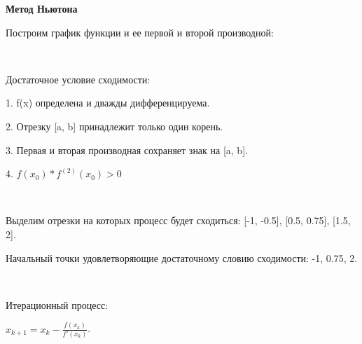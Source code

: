 \documentclass[]{article}
\begin{document}
\newpage
\begin{center}
	\huge\textbf{Метод Ньютона}
\end{center}

Построим график функции и ее первой и второй производной:

\begin{center}
\end{center}


~

Достаточное условие сходимости:

1. f(x) определена и дважды дифференцируема.

2. Отрезку [a, b] принадлежит только один корень.

3. Первая и вторая производная сохраняет знак на [a, b].

4. $f(x_0)*f^{(2)}(x_0) > 0$

~

Выделим отрезки на которых процесс будет сходиться: [-1, -0.5], [0.5, 0.75], [1.5, 2].

Начальный точки удовлетворяющие достаточному словию сходимости: -1, 0.75, 2.

~

Итерационный процесс:

$x_{k+1} = x_{k} - \frac{f(x_{k})}{f'(x_{k})}$.

~
\end{document}
